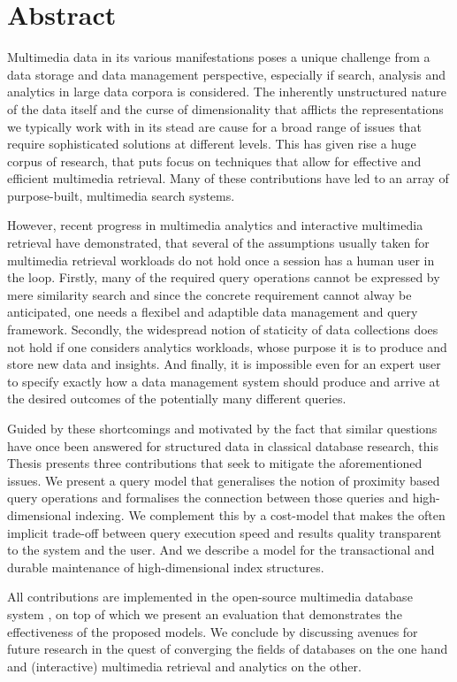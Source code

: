 
\chapter{Abstract}

Multimedia data in its various manifestations poses a unique challenge from a data storage and data management perspective, especially if search, analysis and analytics in large data corpora is considered. The inherently unstructured nature of the data itself and the curse of dimensionality that afflicts the representations we typically work with in its stead are cause for a broad range of issues that require sophisticated solutions at different levels. This has given rise a huge corpus of research, that puts focus on techniques that allow for effective and efficient multimedia retrieval. Many of these contributions have led to an array of purpose-built, multimedia search systems.

However, recent progress in multimedia analytics and interactive multimedia retrieval have demonstrated, that several of the assumptions usually taken for multimedia retrieval workloads do not hold once a session has a human user in the loop. Firstly, many of the required query operations cannot be expressed by mere similarity search and since the concrete requirement cannot alway be anticipated, one needs a flexibel and adaptible data management and query framework. Secondly, the widespread notion of staticity of data collections does not hold if one considers analytics workloads, whose purpose it is to produce and store new data and insights. And finally, it is impossible even for an expert user to specify exactly how a data management system should produce and arrive at the desired outcomes of the potentially many different queries.

Guided by these shortcomings and motivated by the fact that similar questions have once been answered for structured data in classical database research, this Thesis presents three contributions that seek to mitigate the aforementioned issues. We present a query model that generalises the notion of proximity based query operations and formalises the connection between those queries and high-dimensional indexing. We complement this by a cost-model that makes the often implicit trade-off between query execution speed and results quality transparent to the system and the user. And we describe a model for the transactional and durable maintenance of high-dimensional index structures.

All contributions are implemented in the open-source multimedia database system \cottontail{}, on top of which we present an evaluation that demonstrates the effectiveness of the proposed models. We conclude by discussing avenues for future research in the quest of converging the fields of databases on the one hand and (interactive) multimedia retrieval and analytics on the other.